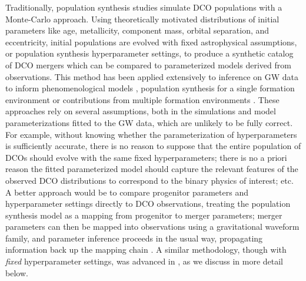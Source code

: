 \documentclass[linenumbers,twocolumn]{aastex631}
\begin{document}
Traditionally, population synthesis studies simulate DCO populations with a
Monte-Carlo approach. Using theoretically motivated distributions of initial
parameters like age, metallicity, component mass, orbital separation, and
eccentricity, initial populations are evolved with fixed astrophysical
assumptions, or population synthesis hyperparameter settings, to produce a
synthetic catalog of DCO mergers which can be compared to parameterized models
derived from observations. This method has been applied extensively to
inference on GW data to inform phenomenological models
\citep[e.g.][]{Fishbach2017, Wysocki2019, Callister2021, Delfavero2021,
Farah2022, Delfavero2022}, population synthesis for a single formation
environment \citep[e.g.][]{Belczynski2016, Stevenson2017b, Taylor2018,
Barrett2018, Mastrogiovanni2022} or contributions from multiple formation
environments \citep[e.g][]{Zevin2017, Stevenson2017, Bouffanais2019, Zevin2021,
Wong2021, Bouffanais2021, Mapelli2022}. These approaches rely on several
assumptions, both in the simulations and model parameterizations fitted to the
GW data, which are unlikely to be fully correct. For example, without
knowing whether the parameterization of hyperparameters is sufficiently
accurate, there is no reason to suppose that the entire population of DCOs
should evolve with the same fixed hyperparameters; there is no a priori reason
the fitted parameterized model should capture the relevant features of the
observed DCO distributions to correspond to the binary physics of interest; etc.
A better approach would be to compare progenitor parameters and hyperparameter
settings directly to DCO observations, treating the population synthesis model
as a mapping from progenitor to merger parameters; merger parameters can then be
mapped into observations using a gravitational waveform family, and parameter
inference proceeds in the usual way, propagating information back up the mapping
chain \citep[e.g.][]{Veitch2015}.  A similar methodology, though with
\emph{fixed} hyperparameter settings, was advanced in
\citet{Andrews2018,Andrews2021}, as we discuss in more detail below.
\end{document}
